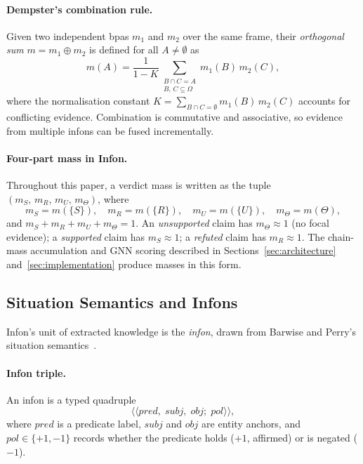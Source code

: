 \paragraph{Dempster's combination rule.}
Given two independent bpas $m_1$ and $m_2$ over the same frame, their
\emph{orthogonal sum} $m = m_1 \oplus m_2$ is defined for all $A \neq
\emptyset$ as
\[
  m(A) = \frac{1}{1 - K} \sum_{\substack{B \cap C = A \\ B,\,C \subseteq \Omega}} m_1(B)\, m_2(C),
\]
where the normalisation constant $K = \sum_{B \cap C = \emptyset} m_1(B)\, m_2(C)$
accounts for conflicting evidence.  Combination is commutative and associative,
so evidence from multiple infons can be fused incrementally.

\paragraph{Four-part mass in Infon.}
Throughout this paper, a verdict mass is written as the tuple
$(m_S,\, m_R,\, m_U,\, m_\Theta)$, where
\[
  m_S = m(\{S\}), \quad
  m_R = m(\{R\}), \quad
  m_U = m(\{U\}), \quad
  m_\Theta = m(\Theta),
\]
and $m_S + m_R + m_U + m_\Theta = 1$.
An \emph{unsupported} claim has $m_\Theta \approx 1$ (no focal evidence);
a \emph{supported} claim has $m_S \approx 1$; a \emph{refuted} claim has
$m_R \approx 1$.  The chain-mass accumulation and GNN scoring described in
Sections~\ref{sec:architecture} and~\ref{sec:implementation} produce masses
in this form.

\subsection{Situation Semantics and Infons}
\label{sec:background:infons}

Infon's unit of extracted knowledge is the \emph{infon}, drawn from
Barwise and Perry's situation semantics~\cite{barwise1983situations}.

\paragraph{Infon triple.}
An infon is a typed quadruple
\[
  \langle\!\langle \mathit{pred},\; \mathit{subj},\; \mathit{obj};\; \mathit{pol} \rangle\!\rangle,
\]
where $\mathit{pred}$ is a predicate label, $\mathit{subj}$ and $\mathit{obj}$
are entity anchors, and $\mathit{pol} \in \{+1, -1\}$ records whether the
predicate holds ($+1$, affirmed) or is negated ($-1$).

